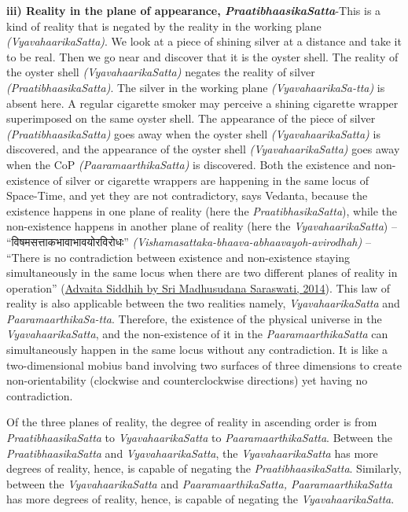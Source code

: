 \documentclass[twoside, 13pt]{article}
\begin{document}
{{\textbf{iii) Reality in the plane of appearance, \textit{PraatibhaasikaSatta}}-This is a kind of reality that is negated by the reality in the working plane \textit{(VyavahaarikaSatta)}. We look at a piece of shining silver at a distance and take it to be real. Then we go near and discover that it is the oyster shell. The reality of the oyster shell \textit{(VyavahaarikaSatta)} negates the reality of silver \textit{(PraatibhaasikaSatta)}. The silver in the working plane \textit{(VyavahaarikaSa-\break tta)} is absent here. A regular cigarette smoker may perceive a shining cigarette wrapper superimposed on the same oyster shell. The appearance of the piece of silver \textit{(PraatibhaasikaSatta)} goes away when the oyster shell \textit{(VyavahaarikaSatta)} is discovered, and the appearance of the oyster shell \textit{(VyavahaarikaSatta)} goes away when the CoP \textit{(PaaramaarthikaSatta)} is discovered. Both the existence and non-existence of silver or cigarette wrappers are happening in the same locus of Space-Time, and yet they are not contradictory, says Vedanta, because the existence happens in one plane of reality (here the \textit{PraatibhasikaSatta}), while the non-existence happens in another plane of reality (here the \textit{VyavahaarikaSatta}) – \foreignlanguage{hindi}{{\fontsize{9}{11}\selectfont “विषमसत्ताकभावाभावयोरविरोधः”}} \textit{(Vishamasattaka-bhaava-abhaavayoh-avirodhah)} – “There is no contradiction between existence and non-existence staying simultaneously in the same locus when there are two different planes of reality in operation” (\underline{Advaita Siddhih by Sri Madhusudana Saraswati, 2014}). This law of reality is also applicable between the two realities namely, \textit{VyavahaarikaSatta} and \textit{PaaramaarthikaSa-\break tta}. Therefore, the existence of the physical universe in the \textit{VyavahaarikaSatta}, and the non-existence of it in the \textit{PaaramaarthikaSatta} can simultaneously happen in the same locus without any contradiction. It is like a two-dimensional mobius band involving two surfaces of three dimensions to create non-orientability (clockwise and counterclockwise directions) yet having no contradiction. 

Of the three planes of reality, the degree of reality in ascending order is from \textit{PraatibhaasikaSatta} to \textit{VyavahaarikaSatta} to \textit{PaaramaarthikaSatta}. Between the \textit{Praatibhaasika\-Satta} and \textit{VyavahaarikaSatta}, the \textit{VyavahaarikaSatta} has more degrees of reality, hence, is capable of negating the \textit{PraatibhaasikaSatta}. Similarly, between the \textit{VyavahaarikaSatta} and \textit{PaaramaarthikaSatta, PaaramaarthikaSatta} has more degrees of reality, hence, is capable of negating the \textit{VyavahaarikaSatta}. 


}}
\end{document}
